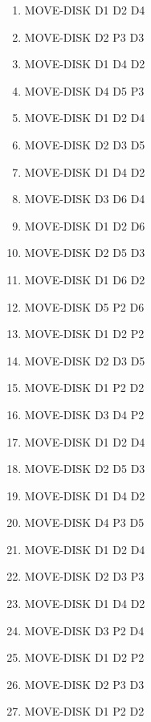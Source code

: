 \documentclass[12pt]{article}
\begin{document}
\begin{appendix}
\begin{itemize}
\begin{enumerate}
	\item  MOVE-DISK D1 D2 D4
	\item  MOVE-DISK D2 P3 D3
	\item  MOVE-DISK D1 D4 D2
	\item  MOVE-DISK D4 D5 P3
	\item  MOVE-DISK D1 D2 D4
	\item  MOVE-DISK D2 D3 D5
	\item  MOVE-DISK D1 D4 D2
	\item  MOVE-DISK D3 D6 D4
	\item  MOVE-DISK D1 D2 D6
	\item  MOVE-DISK D2 D5 D3
	\item  MOVE-DISK D1 D6 D2
	\item  MOVE-DISK D5 P2 D6
	\item  MOVE-DISK D1 D2 P2
	\item  MOVE-DISK D2 D3 D5
	\item  MOVE-DISK D1 P2 D2
	\item  MOVE-DISK D3 D4 P2
	\item  MOVE-DISK D1 D2 D4
	\item  MOVE-DISK D2 D5 D3
	\item  MOVE-DISK D1 D4 D2
	\item  MOVE-DISK D4 P3 D5
	\item  MOVE-DISK D1 D2 D4
	\item  MOVE-DISK D2 D3 P3
	\item  MOVE-DISK D1 D4 D2
	\item  MOVE-DISK D3 P2 D4
	\item  MOVE-DISK D1 D2 P2
	\item  MOVE-DISK D2 P3 D3
	\item  MOVE-DISK D1 P2 D2
      \end{enumerate}
   
  \end{itemize}

\end{appendix}

\newpage
\end{document}
